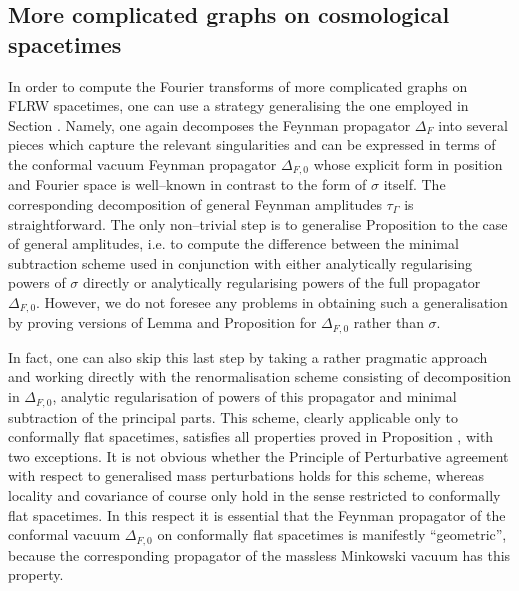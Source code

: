 \documentclass[10pt]{book}
\theoremstyle{break}
\begin{document}
\subsection{More complicated graphs on cosmological spacetimes}


In order to compute the Fourier transforms of more complicated graphs on FLRW spacetimes, one can use a strategy generalising the one employed in Section %
. Namely, one again decomposes the Feynman propagator $\Delta_F$ into several pieces which capture the relevant singularities and can be expressed in terms of the conformal vacuum Feynman propagator $\Delta_{F,0}$ whose explicit form in position and Fourier space is well--known in contrast to the form of $\sigma$ itself. The corresponding decomposition of general Feynman amplitudes $\tau_\Gamma$ is straightforward. The only non--trivial step is to generalise Proposition %
to the case of general amplitudes, i.e. to compute the difference between the minimal subtraction scheme used in conjunction with either analytically regularising powers of $\sigma$ directly or analytically regularising powers of the full propagator $\Delta_{F,0}$. However, we do not foresee any problems in obtaining such a generalisation by 
proving versions of Lemma %
and Proposition %
for $\Delta_{F,0}$ rather than $\sigma$.

In fact, one can also skip this last step by taking a rather pragmatic approach and working directly with the renormalisation scheme consisting of decomposition in $\Delta_{F,0}$, analytic regularisation of powers of this propagator and minimal subtraction of the principal parts. This scheme, clearly applicable only to conformally flat spacetimes, satisfies all properties proved in Proposition %
, with two exceptions. It is not obvious whether the Principle of Perturbative agreement with respect to generalised mass perturbations holds for this scheme, whereas locality and covariance of course only hold in the sense restricted to conformally flat spacetimes. In this respect it is essential that the Feynman propagator of the conformal vacuum $\Delta_{F,0}$ on conformally flat spacetimes is manifestly ``geometric'', because the corresponding propagator of the massless Minkowski vacuum has this property.
\end{document}
